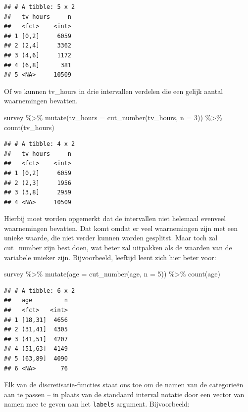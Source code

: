 \documentclass[]{tufte-book}
\newenvironment{Shaded}{}{}
\newcommand{\AttributeTok}[1]{\textcolor[rgb]{0.49,0.56,0.16}{#1}}
\newcommand{\DecValTok}[1]{\textcolor[rgb]{0.25,0.63,0.44}{#1}}
\newcommand{\FunctionTok}[1]{\textcolor[rgb]{0.02,0.16,0.49}{#1}}
\newcommand{\NormalTok}[1]{#1}
\newcommand{\SpecialCharTok}[1]{\textcolor[rgb]{0.25,0.44,0.63}{#1}}
\begin{document}
\begin{verbatim}
## # A tibble: 5 x 2
##   tv_hours     n
##   <fct>    <int>
## 1 [0,2]     6059
## 2 (2,4]     3362
## 3 (4,6]     1172
## 4 (6,8]      381
## 5 <NA>     10509
\end{verbatim}

Of we kunnen tv\_hours in drie intervallen verdelen die een gelijk aantal waarnemingen bevatten.

\begin{Shaded}
\begin{Highlighting}[]
\NormalTok{survey }\SpecialCharTok{\%\textgreater{}\%}
  \FunctionTok{mutate}\NormalTok{(}\AttributeTok{tv\_hours =} \FunctionTok{cut\_number}\NormalTok{(tv\_hours, }\AttributeTok{n =} \DecValTok{3}\NormalTok{)) }\SpecialCharTok{\%\textgreater{}\%}
  \FunctionTok{count}\NormalTok{(tv\_hours)}
\end{Highlighting}
\end{Shaded}

\begin{verbatim}
## # A tibble: 4 x 2
##   tv_hours     n
##   <fct>    <int>
## 1 [0,2]     6059
## 2 (2,3]     1956
## 3 (3,8]     2959
## 4 <NA>     10509
\end{verbatim}

Hierbij moet worden opgemerkt dat de intervallen niet helemaal evenveel waarnemingen bevatten. Dat komt omdat er veel waarnemingen zijn met een unieke waarde, die niet verder kunnen worden gesplitst. Maar toch zal cut\_number zijn best doen, wat beter zal uitpakken als de waarden van de variabele unieker zijn. Bijvoorbeeld, leeftijd leent zich hier beter voor:

\begin{Shaded}
\begin{Highlighting}[]
\NormalTok{survey }\SpecialCharTok{\%\textgreater{}\%}
  \FunctionTok{mutate}\NormalTok{(}\AttributeTok{age =} \FunctionTok{cut\_number}\NormalTok{(age, }\AttributeTok{n =} \DecValTok{5}\NormalTok{)) }\SpecialCharTok{\%\textgreater{}\%}
  \FunctionTok{count}\NormalTok{(age)}
\end{Highlighting}
\end{Shaded}

\begin{verbatim}
## # A tibble: 6 x 2
##   age         n
##   <fct>   <int>
## 1 [18,31]  4656
## 2 (31,41]  4305
## 3 (41,51]  4207
## 4 (51,63]  4149
## 5 (63,89]  4090
## 6 <NA>       76
\end{verbatim}

Elk van de discretisatie-functies staat ons toe om de namen van de categorieën aan te passen -- in plaats van de standaard interval notatie door een vector van namen mee te geven aan het \texttt{labels} argument. Bijvoorbeeld:
\end{document}
